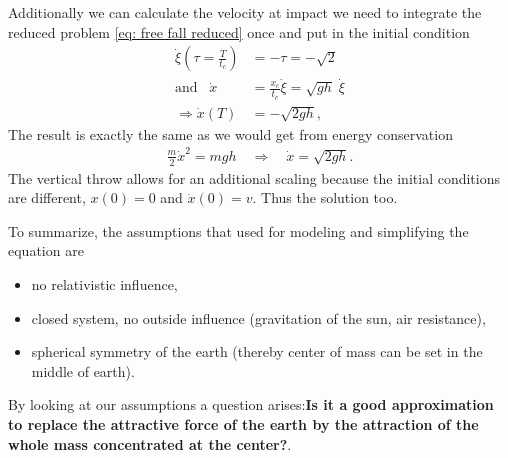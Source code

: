 \documentclass[a4paper]{article}
\begin{document}
Additionally we can calculate the velocity at impact we need to integrate the
reduced problem \ref{eq: free fall reduced} once and put in the initial
condition
\begin{align}
    \dot{\xi}(\tau = \frac{T}{t_c}) &= -\tau = -\sqrt{2} \\
    \text{and} \;\;\; \dot{x} &= \frac{x_c}{t_c}\dot{\xi} =
    \sqrt{gh}\; \dot{\xi}\\
    \Rightarrow \dot{x}(T) &= -\sqrt{2gh},
\end{align}
The result is exactly the same as we would get from energy conservation
\begin{align}
    \frac{m}{2}\dot{x}^2 = mgh \quad \Rightarrow \quad \dot{x} = \sqrt{2gh}.
\end{align}
The vertical throw allows for an additional scaling because the
initial conditions are different, $x(0) = 0$ and $\dot{x}(0) = v$. Thus
the solution too.

To summarize, the assumptions that used for modeling and simplifying the
equation are
\begin{itemize}
    \item no relativistic influence,
    \item closed system, no outside influence (gravitation of the sun, air
        resistance),
    \item spherical symmetry of the earth (thereby center of mass can be
        set in the middle of earth).
\end{itemize}
By looking at our assumptions a question arises:\textbf{Is it a good
approximation to replace the attractive force of the earth by the attraction
of the whole mass concentrated at the center?}.
\end{document}
